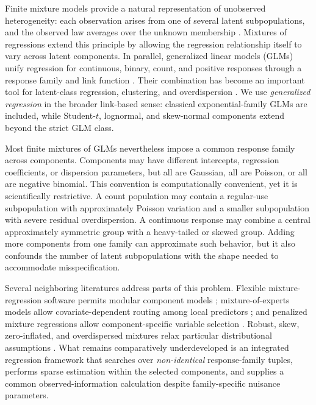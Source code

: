 \documentclass[11pt]{article}
\begin{document}
Finite mixture models provide a natural representation of unobserved
heterogeneity: each observation arises from one of several latent
subpopulations, and the observed law averages over the unknown membership
\citep{mclachlan2000finite}.  Mixtures of regressions extend this principle by
allowing the regression relationship itself to vary across latent components.
In parallel, generalized linear models (GLMs) unify regression for continuous,
binary, count, and positive responses through a response family and link
function \citep{nelder1972glm,mccullagh1989glm}.  Their combination has become
an important tool for latent-class regression, clustering, and overdispersion
\citep{leisch2004flexmix,grun2007fitting,grun2008finite}.
We use \emph{generalized regression} in the broader link-based sense:
classical exponential-family GLMs are included, while Student-$t$, lognormal,
and skew-normal components extend beyond the strict GLM class.

Most finite mixtures of GLMs nevertheless impose a common response family
across components.  Components may have different intercepts, regression
coefficients, or dispersion parameters, but all are Gaussian, all are Poisson,
or all are negative binomial.  This convention is computationally convenient,
yet it is scientifically restrictive.  A count population may contain a
regular-use subpopulation with approximately Poisson variation and a smaller
subpopulation with severe residual overdispersion.  A continuous response may
combine a central approximately symmetric group with a heavy-tailed or skewed
group.  Adding more components from one family can approximate such behavior,
but it also confounds the number of latent subpopulations with the shape needed
to accommodate misspecification.

Several neighboring literatures address parts of this problem.  Flexible
mixture-regression software permits modular component models
\citep{leisch2004flexmix,grun2007fitting}; mixture-of-experts models allow
covariate-dependent routing among local predictors \citep{jacobs1991experts};
and penalized mixture regressions allow component-specific variable selection
\citep{khalili2007variable,stadler2010l1}.  Robust, skew, zero-inflated, and
overdispersed mixtures relax particular distributional assumptions
\citep{azzalini1985skew,lambert1992zip}.  What remains comparatively
underdeveloped is an integrated regression framework that searches over
\emph{non-identical} response-family tuples, performs sparse estimation within
the selected components, and supplies a common observed-information calculation
despite family-specific nuisance parameters.
\end{document}
